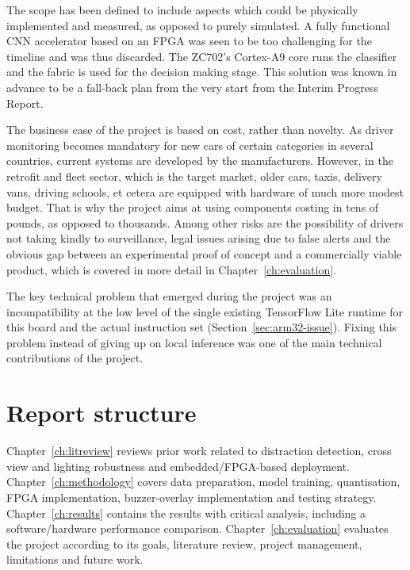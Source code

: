 The scope has been defined to include aspects which could be physically implemented and measured, as opposed to purely simulated. A fully functional CNN accelerator based on an FPGA was seen to be too challenging for the timeline and was thus discarded. The ZC702’s Cortex-A9 core runs the classifier and the fabric is used for the decision making stage. This solution was known in advance to be a fall-back plan from the very start from the Interim Progress Report.

The business case of the project is based on cost, rather than novelty. As driver monitoring becomes mandatory for new cars of certain categories in several countries, current systems are developed by the manufacturers. However, in the retrofit and fleet sector, which is the target market, older cars, taxis, delivery vans, driving schools, et cetera are equipped with hardware of much more modest budget. That is why the project aims at using components costing in tens of pounds, as opposed to thousands. Among other risks are the possibility of drivers not taking kindly to surveillance, legal issues arising due to false alerts and the obvious gap between an experimental proof of concept and a commercially viable product, which is covered in more detail in Chapter~\ref{ch:evaluation}.

The key technical problem that emerged during the project was an incompatibility at the low level of the single existing TensorFlow Lite runtime for this board and the actual instruction set (Section~\ref{sec:arm32-issue}). Fixing this problem instead of giving up on local inference was one of the main technical contributions of the project.

\section{Report structure}

Chapter~\ref{ch:litreview} reviews prior work related to distraction detection, cross view and lighting robustness and embedded/FPGA-based deployment. Chapter~\ref{ch:methodology} covers data preparation, model training, quantisation, FPGA implementation, buzzer-overlay implementation and testing strategy. Chapter~\ref{ch:results} contains the results with critical analysis, including a software/hardware performance comparison. Chapter~\ref{ch:evaluation} evaluates the project according to its goals, literature review, project management, limitations and future work.
